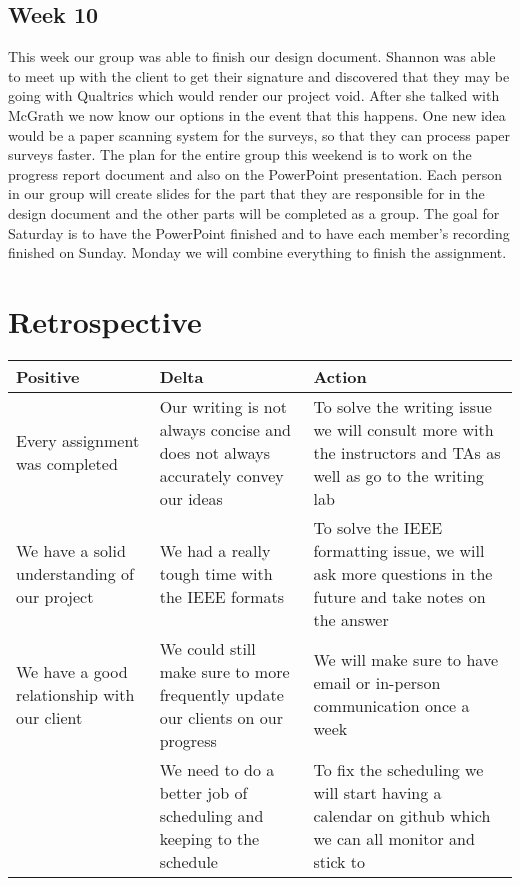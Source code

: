 \documentclass[letterpaper,10pt,serif, draftclsnofoot,onecolumn, compsoc, titlepage]{IEEEtran}
\begin{document}
\subsection{Week 10}
This week our group was able to finish our design document. Shannon was able to meet up with the client to get their signature and discovered that they may be going with Qualtrics which would render our project void. After she talked with McGrath we now know our options in the event that this happens. One new idea would be a paper scanning system for the surveys, so that they can process paper surveys faster. The plan for the entire group this weekend is to work on the progress report document and also on the PowerPoint presentation. Each person in our group will create slides for the part that they are responsible for in the design document and the other parts will be completed as a group. The goal for Saturday is to have the PowerPoint finished and to have each member's recording finished on Sunday. Monday we will combine everything to finish the assignment. 

\section{Retrospective}
\begin{center}
    \begin{tabular}{ | p{5cm} | p{5cm} | p{5cm} |}
    \hline
     Positive & Delta & Action \\ \hline
  	Every assignment was completed & Our writing is not always concise and does not always accurately convey our ideas & To solve the writing issue we will consult more with the instructors and TAs as well as go to the writing lab \\\hline
	We have a solid understanding of our project & We had a really tough time with the IEEE formats & To solve the IEEE formatting issue, we will ask more questions in the future and take notes on the answer \\ \hline
	We have a good relationship with our client & We could still make sure to more frequently update our clients on our progress & We will make sure to have email or in-person communication once a week \\ \hline
	&We need to do a better job of scheduling and keeping to the schedule& To fix the scheduling we will start having a calendar on github which we can all monitor and stick to \\ \hline
    \end{tabular}
\end{center}
\end{document}
